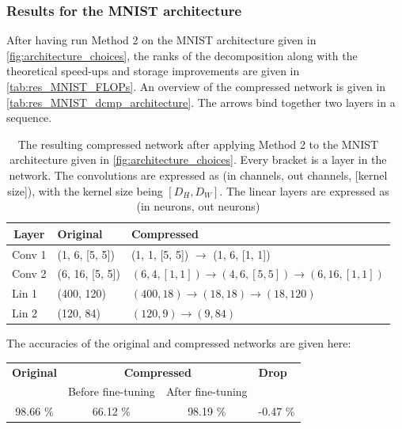 \subsubsection{Results for the MNIST architecture}
After having run Method 2 on the MNIST architecture given in \autoref{fig:architecture_choices}, the ranks of the decomposition along with the theoretical speed-ups and storage improvements are given in \autoref{tab:res_MNIST_FLOPs}. An overview of the compressed network is given in \autoref{tab:res_MNIST_dcmp_architecture}. The arrows bind together two layers in a sequence.
\begin{table}
\centering
\captionsetup{width=.95\linewidth}
\caption{The resulting compressed network after applying Method 2 to the MNIST architecture given in \autoref{fig:architecture_choices}. Every bracket is a layer in the network. The convolutions are expressed as (in channels, out channels, [kernel size]), with the kernel size being $[D_H, D_W]$. The linear layers are expressed as (in neurons, out neurons)}
\label{tab:res_MNIST_dcmp_architecture}
\begin{tabular}{cll}
\textbf{Layer}            & \textbf{Original}              & \textbf{Compressed}                                                          \\ \hline
Conv 1                    & (1, 6, [5, 5])                 & (1, 1, [5, 5]) $\rightarrow$ (1, 6, [1, 1])                                  \\
Conv 2                    & (6, 16, [5, 5])                & $ (6, 4, [1, 1]) \rightarrow (4, 6, [5, 5]) \rightarrow (6, 16, [1, 1]) $    \\ \hline
\multicolumn{1}{l}{Lin 1} & \multicolumn{1}{l}{(400, 120)} & \multicolumn{1}{l}{$ (400, 18) \rightarrow (18, 18) \rightarrow (18, 120) $} \\
\multicolumn{1}{l}{Lin 2} & \multicolumn{1}{l}{(120, 84)}  & \multicolumn{1}{l}{$ (120, 9) \rightarrow (9, 84) $}                        
\end{tabular}
\end{table}
The accuracies of the original and compressed networks are given here:
\begin{table}[H]
\centering
\begin{tabular}{cccl}
\textbf{Original} & \multicolumn{2}{c}{\textbf{Compressed}} & \textbf{Drop} \\
                  & Before fine-tuning  & After fine-tuning &               \\
98.66 \%          & 66.12 \%            & 98.19 \%          & -0.47 \%        
\end{tabular}
\end{table}

